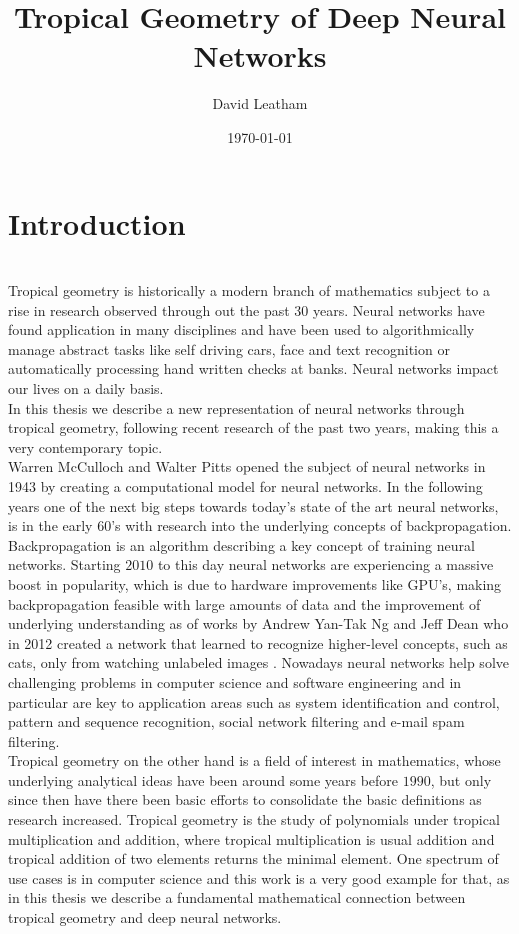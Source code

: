 \documentclass{article}
\title{Tropical Geometry of Deep Neural Networks}
\author{David Leatham}
\date{\today}
\theoremstyle{definition}
\begin{document}


\newpage
  
\tableofcontents

\newpage


\section{Introduction} 
\leavevmode
\\
Tropical geometry is historically a modern branch of mathematics subject to a rise in research observed through out the past 30 years. Neural networks have found application in many disciplines and have been used to algorithmically manage abstract tasks like self driving cars, face and text recognition or automatically processing hand written checks at banks. Neural networks impact our lives on a daily basis. \\
In this thesis we describe a new representation of neural networks through tropical geometry, following recent research of the past two years, making this a very contemporary topic. \\

Warren McCulloch and Walter Pitts opened the subject of neural networks in 1943 by creating a computational model for neural networks. In the following years one of the next big steps towards today's state of the art neural networks, is in the early 60's with research into the underlying concepts of backpropagation. Backpropagation is an algorithm describing a key concept of training neural networks. Starting $2010$ to this day neural networks are experiencing a massive boost in popularity, which is due to hardware improvements like GPU's, making backpropagation feasible with large amounts of data and the improvement of underlying understanding as of works by Andrew Yan-Tak Ng and Jeff Dean who in 2012 created a network that learned to recognize higher-level concepts, such as cats, only from watching unlabeled images \cite{DBLP:journals/corr/abs-1112-6209}. Nowadays neural networks help solve challenging problems in computer science and software engineering and in particular are key to application areas such as system identification and control, pattern and sequence recognition, social network filtering and e-mail spam filtering. \\
Tropical geometry on the other hand is a field of interest in mathematics, whose underlying analytical ideas have been around some years before $1990$, but only since then have there been basic efforts to consolidate the basic definitions as research increased. Tropical geometry is the study of polynomials under tropical multiplication and addition, where tropical multiplication is usual addition and tropical addition of two elements returns the minimal element. One spectrum of use cases is in computer science and this work is a very good example for that, as in this thesis we describe a fundamental mathematical connection between tropical geometry and deep neural networks. \\
\end{document}
